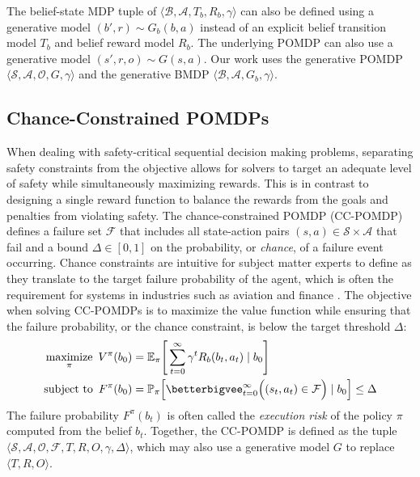 The belief-state MDP tuple of $\langle \mathcal{B}, \mathcal{A}, T_b, R_b, \gamma \rangle$ can also be defined using a generative model $(b', r) \sim G_b(b, a)$ instead of an explicit belief transition model $T_b$ and belief reward model $R_b$.
The underlying POMDP can also use a generative model $(s', r, o) \sim G(s, a)$.
Our work uses the generative POMDP $\langle \mathcal{S}, \mathcal{A}, \mathcal{O}, G, \gamma \rangle$ and the generative BMDP $\langle \mathcal{B}, \mathcal{A}, G_b, \gamma \rangle$.


\subsection{Chance-Constrained POMDPs}
When dealing with safety-critical sequential decision making problems, separating safety constraints from the objective allows for solvers to target an adequate level of safety while simultaneously maximizing rewards.
This is in contrast to designing a single reward function to balance the rewards from the goals and penalties from violating safety. 
The chance-constrained POMDP (CC-POMDP) defines a failure set $\mathcal{F}$ that includes all state-action pairs $(s, a) \in \mathcal{S} \times \mathcal{A}$ that fail and a bound $\Delta \in [0, 1]$ on the probability, or \textit{chance}, of a failure event occurring.
Chance constraints are intuitive for subject matter experts to define as they translate to the target failure probability of the agent, which is often the requirement for systems in industries such as aviation \cite{busch1985methodology} and finance \cite{flannery1989capital}.
The objective when solving CC-POMDPs is to maximize the value function while ensuring that the failure probability, or the chance constraint, is below the target threshold $\Delta$:
{\small
\begin{alignat}{1}
    \operatornamewithlimits{maximize}_\pi \,\, V^\pi(b_0) &= \mathbb{E}_\pi \Bigg[ \sum_{t=0}^\infty \gamma^t R_b(b_t, a_t) \mid b_0 \Bigg] \\
    \operatorname{subject~to} \,\, F^\pi(b_0) &= \mathbb{P}_\pi \!\left[ \betterbigvee_{t=0}^\infty \Big( (s_t, a_t) \in \mathcal{F} \Big) \mid b_0 \right] \le \Delta
\end{alignat}
}%
The failure probability $F^\pi(b_t)$ is often called the \textit{execution risk} \cite{santana2016rao} of the policy $\pi$ computed from the belief $b_t$.
Together, the CC-POMDP is defined as the tuple $\langle \mathcal{S}, \mathcal{A}, \mathcal{O}, \mathcal{F}, T, R, O, \gamma, \Delta \rangle$, which may also use a generative model $G$ to replace $\langle T,R,O \rangle$.

